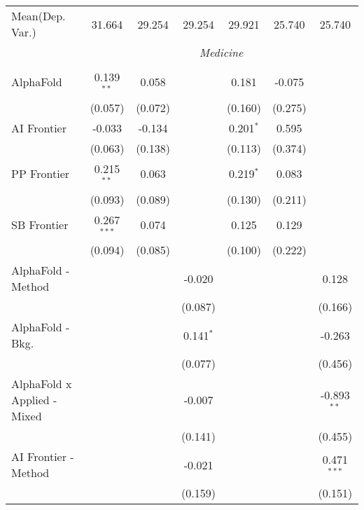 \begin{tabular}{lcccccc}
Mean(Dep. Var.) & 31.664 & 29.254 & 29.254 & 29.921 & 25.740 & 25.740 \\
 & \multicolumn{6}{c}{\textit{Medicine}} \\ \\
   AlphaFold                     & 0.139$^{**}$  & 0.058   &                & 0.181       & -0.075  &   \\   
                                 & (0.057)       & (0.072) &                & (0.160)     & (0.275) &   \\   
   AI Frontier                   & -0.033        & -0.134  &                & 0.201$^{*}$ & 0.595   &   \\   
                                 & (0.063)       & (0.138) &                & (0.113)     & (0.374) &   \\   
   PP Frontier                   & 0.215$^{**}$  & 0.063   &                & 0.219$^{*}$ & 0.083   &   \\   
                                 & (0.093)       & (0.089) &                & (0.130)     & (0.211) &   \\   
   SB Frontier                   & 0.267$^{***}$ & 0.074   &                & 0.125       & 0.129   &   \\   
                                 & (0.094)       & (0.085) &                & (0.100)     & (0.222) &   \\   
   AlphaFold - Method            &               &         & -0.020         &             &         & 0.128\\   
                                 &               &         & (0.087)        &             &         & (0.166)\\   
   AlphaFold - Bkg.              &               &         & 0.141$^{*}$    &             &         & -0.263\\   
                                 &               &         & (0.077)        &             &         & (0.456)\\   
   AlphaFold x Applied - Mixed   &               &         & -0.007         &             &         & -0.893$^{**}$\\   
                                 &               &         & (0.141)        &             &         & (0.455)\\   
   AI Frontier - Method          &               &         & -0.021         &             &         & 0.471$^{***}$\\   
                                 &               &         & (0.159)        &             &         & (0.151)\\   

\end{tabular}

